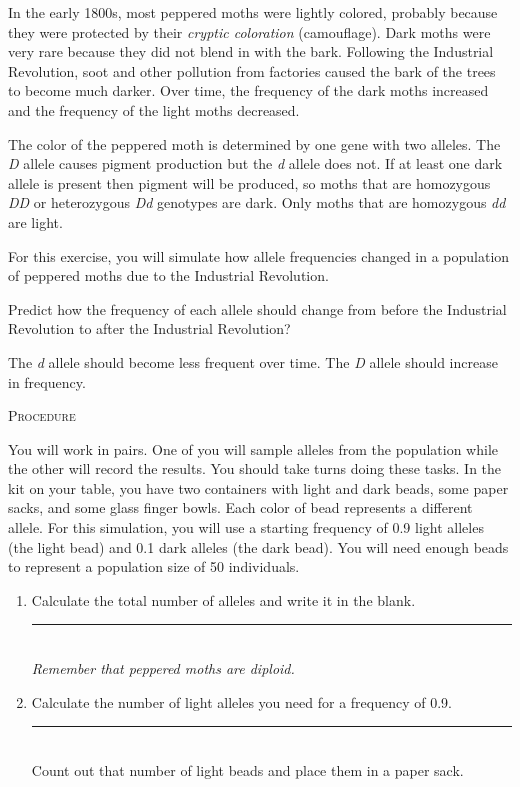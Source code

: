 \documentclass[12pt]{exam}
\newcommand*\AnswerBox[2]{%
    \parbox[t][#1]{0.92\textwidth}{%
    \begin{solution}#2\end{solution}}
    \vspace{\stretch{1}}
}
\newcommand{\allele}[1]{\textit{#1}}
\begin{document}
\begin{questions}
In the early 1800s, most peppered moths were lightly colored, probably because they were protected by their \emph{cryptic coloration} (camouflage). Dark moths were very rare because they did not blend in with the bark. Following the Industrial Revolution, soot and other pollution from factories caused the bark of the trees to become much darker. Over time, the frequency of the dark moths increased and the frequency of the light moths decreased. 

The color of the peppered moth is determined by one gene with two alleles. The \allele{D} allele causes pigment production but the \allele{d} allele does not. If at least one dark allele is present then pigment will be produced, so moths that are homozygous \allele{DD} or heterozygous \allele{Dd} genotypes are dark. Only moths that are homozygous \allele{dd} are light. 

For this exercise, you will simulate how allele frequencies changed in a population of peppered moths due to the Industrial Revolution. 

\question\label{ques:selection_prediction}
Predict how the frequency of each allele should change from before the Industrial Revolution to after the Industrial Revolution?

\AnswerBox{2\baselineskip}{The \allele{d} allele should become less frequent over time. The \allele{D} allele should increase in frequency.}

\textsc{Procedure}

\medskip

You will work in pairs. One of you will sample alleles from the population while the other will record the results. You should take turns doing these tasks.  In the kit on your table, you have two containers with light and dark beads, some paper sacks, and some glass finger bowls. Each color of bead represents a different allele. For this simulation, you will use a starting frequency of 0.9 light alleles (the light bead) and 0.1 dark alleles (the dark bead). You will need enough beads to represent a population size of 50 individuals.

\begin{enumerate}

	\item Calculate the total number of alleles and write it in the blank. \hfill \rule{0.5in}{0.4pt}\\ \emph{Remember that peppered moths are diploid.} 
	
	\item Calculate the number of light alleles you need for a frequency of 0.9. \hfill \rule{0.5in}{0.4pt} \\ Count out that number of light beads and place them in a paper sack. 
	

\end{enumerate}
\end{questions}
\end{document}
